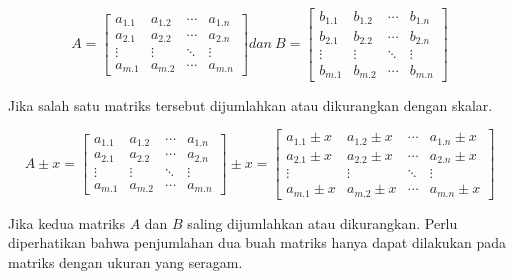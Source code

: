\documentclass[
]{book}
\theoremstyle{definition}
\theoremstyle{definition}
\theoremstyle{definition}
\theoremstyle{definition}
\theoremstyle{remark}
\begin{document}
\begin{equation}
A = \begin{bmatrix}
       a_{1.1} & a_{1.2} &\cdots& a_{1.n}           \\[0.3em]
       a_{2.1} & a_{2.2} &\cdots& a_{2.n}           \\[0.3em]
       \vdots  & \vdots  &\ddots& \vdots            \\[0.3em]
       a_{m.1} & a_{m.2} &\cdots& a_{m.n}
     \end{bmatrix}
dan\ B = \begin{bmatrix}
      b_{1.1} & b_{1.2} &\cdots& b_{1.n}           \\[0.3em]
      b_{2.1} & b_{2.2} &\cdots& b_{2.n}           \\[0.3em]
      \vdots  & \vdots  &\ddots& \vdots            \\[0.3em]
      b_{m.1} & b_{m.2} &\cdots& b_{m.n}
     \end{bmatrix}
  \label{eq:matrikuv}
\end{equation}

Jika salah satu matriks tersebut dijumlahkan atau dikurangkan dengan skalar.

\begin{equation}
A \pm x = \begin{bmatrix}
       a_{1.1} & a_{1.2} &\cdots& a_{1.n}           \\[0.3em]
       a_{2.1} & a_{2.2} &\cdots& a_{2.n}           \\[0.3em]
       \vdots  & \vdots  &\ddots& \vdots            \\[0.3em]
       a_{m.1} & a_{m.2} &\cdots& a_{m.n}
     \end{bmatrix}
\pm x = \begin{bmatrix}
      a_{1.1}\pm x & a_{1.2}\pm x &\cdots& a_{1.n}\pm x           \\[0.3em]
      a_{2.1}\pm x & a_{2.2}\pm x &\cdots& a_{2.n}\pm x           \\[0.3em]
      \vdots  & \vdots  &\ddots& \vdots            \\[0.3em]
      a_{m.1}\pm x & a_{m.2}\pm x &\cdots& a_{m.n}\pm x
     \end{bmatrix}
  \label{eq:addmatrik}
\end{equation}

Jika kedua matriks \(A\) dan \(B\) saling dijumlahkan atau dikurangkan. Perlu diperhatikan bahwa penjumlahan dua buah matriks hanya dapat dilakukan pada matriks dengan ukuran yang seragam.
\end{document}
